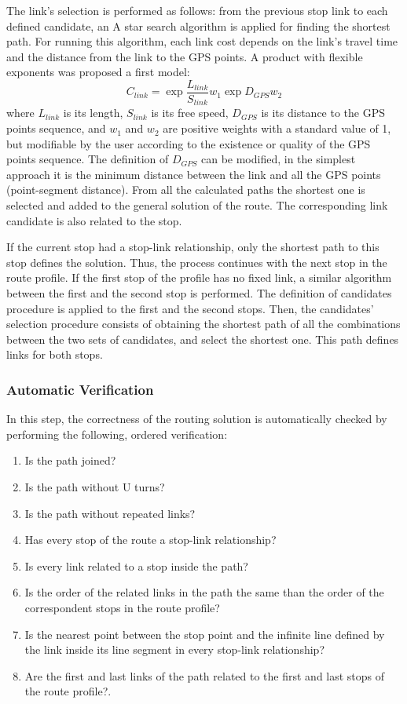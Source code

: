 The link's selection is performed as follows: from the previous stop link to each defined candidate, an A star search algorithm is applied for finding the shortest path. For running this algorithm, each link cost depends on the link's travel time and the distance from the link to the GPS points. A product with flexible exponents was proposed a first model:
%
\begin{equation}
\label{eq:LinkCost}
	C_{link} = \exp{\frac{L_{link}}{S_{link}}}{w_{1}}\exp{D_{GPS}}{w_{2}}
\end{equation}
%
where $L_{link}$ is its length, $S_{link}$ is its free speed, $D_{GPS}$ is its distance to the GPS points sequence, and $w_{1}$ and $w_{2}$ are positive weights with a standard value of 1, but modifiable by the user according to the existence or quality of the GPS points sequence. The definition of $D_{GPS}$ can be modified, in the simplest approach it is the minimum distance between the link and all the GPS points (point-segment distance). From all the calculated paths the shortest one is selected and added to the general solution of the route. The corresponding link candidate is also related to the stop. 

If the current stop had a stop-link relationship, only the shortest path to this stop defines the solution. Thus, the process continues with the next stop in the route profile. If the first stop of the profile has no fixed link, a similar algorithm between the first and the second stop is performed. The definition of candidates procedure is applied to the first and the second stops. Then, the candidates' selection procedure consists of obtaining the shortest path of all the combinations between the two sets of candidates, and select the shortest one. This path defines links for both stops.

\subsubsection{Automatic Verification}
In this step, the correctness of the routing solution is automatically checked by performing the following, ordered verification:
%
\begin{enumerate}
\item Is the path joined?
\item Is the path without U turns?
\item Is the path without repeated links?
\item Has every stop of the route a stop-link relationship?
\item Is every link related to a stop inside the path?
\item Is the order of the related links in the path the same than the order of the correspondent stops in the route profile?
\item Is the nearest point between the stop point and the infinite line defined by the link inside its line segment in every stop-link relationship?
\item Are the first and last links of the path related to the first and last  stops of the route profile?.
\end{enumerate}

